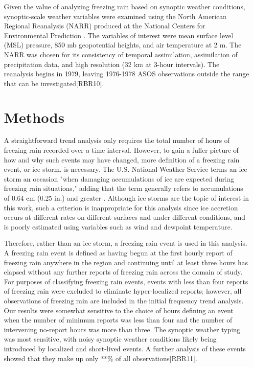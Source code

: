 \documentclass[twocol]{ametsoc}
\begin{document}
Given the value of analyzing freezing rain based on synoptic weather conditions, synoptic-scale weather variables were examined using the North American Regional Reanalysis (NARR) produced at the National Centers for Environmental Prediction \citep{mesinger2006north}. The variables of interest were mean surface level (MSL) pressure, 850 mb geopotential heights, and air temperature at 2 m. The NARR was chosen for its consistency of temporal assimilation, assimilation of precipitation data, and high resolution (32 km at 3-hour intervals). The reanalysis begins in 1979, leaving 1976-1978 ASOS observations outside the range that can be investigated[RBR10].





\section{Methods}

A straightforward trend analysis only requires the total number of hours of freezing rain recorded over a time interval. However, to gain a fuller picture of how and why such events may have changed, more definition of a freezing rain event, or ice storm, is necessary. The U.S. National Weather Service terms an ice storm an occasion "when damaging accumulations of ice are expected during freezing rain situations," adding that the term generally refers to accumulations of 0.64 cm (0.25 in.) and greater \citep{nwsglossary}. Although ice storms are the topic of interest in this work, such a criterion is inappropriate for this analysis since ice accretion occurs at different rates on different surfaces and under different conditions, and is poorly estimated using variables such as wind and dewpoint temperature. 



Therefore, rather than an ice storm, a freezing rain event is used in this analysis. A freezing rain event is defined as having begun at the first hourly report of freezing rain anywhere in the region and continuing until at least three hours has elapsed without any further reports of freezing rain across the domain of study. For purposes of classifying freezing rain events, events with less than four reports of freezing rain were excluded to eliminate hyper-localized reports; however, all observations of freezing rain are included in the initial frequency trend analysis. Our results were somewhat sensitive to the choice of hours defining an event when the number of minimum reports was less than four and the number of intervening no-report hours was more than three. The synoptic weather typing was most sensitive, with noisy synoptic weather conditions likely being introduced by localized and short-lived events. A further analysis of these events showed that they make up only **\% of all observations[RBR11].
\end{document}
